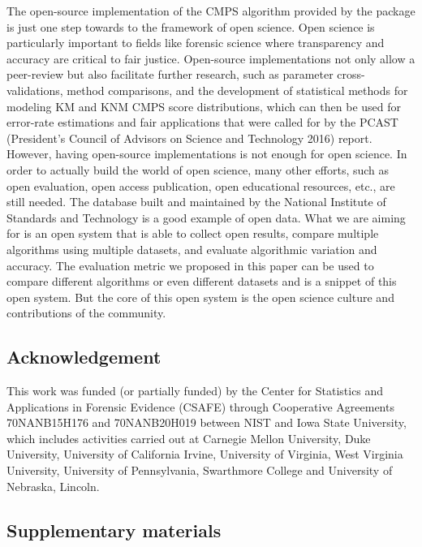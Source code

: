 The open-source implementation of the CMPS algorithm provided by the  package is just one step towards to the framework of open science. Open science is particularly important to fields like forensic science where transparency and accuracy are critical to fair justice.
Open-source implementations not only allow a peer-review but also facilitate further research, such as parameter cross-validations, method comparisons, and the development of statistical methods for modeling KM and KNM CMPS score distributions, which can then be used for error-rate estimations and fair applications that were called for by the PCAST (President's Council of Advisors on Science and Technology 2016) report.
However, having open-source implementations is not enough for open science.
In order to actually build the world of open science, many other efforts, such as open evaluation, open access publication, open educational resources, etc., are still needed.
The database built and maintained by the National Institute of Standards and Technology is a good example of open data.
What we are aiming for is an open system that is able to collect open results, compare multiple algorithms using multiple datasets, and evaluate algorithmic variation and accuracy.
The evaluation metric we proposed in this paper can be used to compare different algorithms or even different datasets and is a snippet of this open system.
But the core of this open system is the open science culture and contributions of the community.

\hypertarget{acknowledgement}{%
\subsection{Acknowledgement}\label{acknowledgement}}

This work was funded (or partially funded) by the Center for Statistics and Applications in Forensic Evidence (CSAFE) through Cooperative Agreements 70NANB15H176 and 70NANB20H019 between NIST and Iowa State University, which includes activities carried out at Carnegie Mellon University, Duke University, University of California Irvine, University of Virginia, West Virginia University, University of Pennsylvania, Swarthmore College and University of Nebraska, Lincoln.

\hypertarget{supplementary-materials}{%
\subsection{Supplementary materials}\label{supplementary-materials}}

